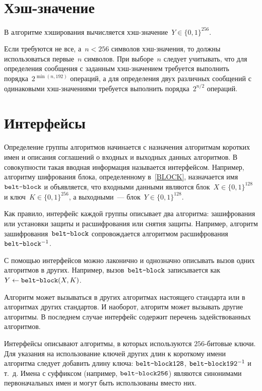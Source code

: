\section{Хэш-значение}\label{COMMON.Hash}

В алгоритме хэширования вычисляется хэш-значение~$Y\in\{0,1\}^{256}$.

Если требуются не все, а~$n<256$ символов хэш-значения, 
то должны использоваться первые~$n$ символов.
%
При выборе~$n$ следует учитывать, что для определения сообщения с заданным
хэш-значением требуется выполнить порядка~$2^{\min(n,192)}$ операций, а для
определения двух различных сообщений с одинаковыми хэш-значениями требуется
выполнить порядка~$2^{n/2}$ операций.

\section{Интерфейсы}\label{COMMON.IFace}

Определение группы алгоритмов начинается с назначения алгоритмам коротких 
имен и описания соглашений о входных и выходных данных алгоритмов.
В совокупности такая вводная информация называется интерфейсом.
%
Например, алгоритму шифрования блока, определенному в~\ref{BLOCK},
назначается имя~$\texttt{belt-block}$ и объявляется, что входными 
данными являются блок~$X\in\{0,1\}^{128}$ и ключ~$K\in\{0,1\}^{256}$,
а выходными~--- блок~$Y\in\{0,1\}^{128}$.

Как правило, интерфейс каждой группы описывает два алгоритма: зашифрования 
или установки защиты и расшифрования или снятия защиты. Например, 
алгоритм зашифрования~$\texttt{belt-block}$ сопровождается 
алгоритмом расшифрования~$\texttt{belt-block}^{-1}$.

С помощью интерфейсов можно лаконично и однозначно 
описывать вызов одних алгоритмов в других.
%        	
Например, вызов~$\texttt{belt-block}$ 
записывается как~$Y\leftarrow\texttt{belt-block}(X,K)$.

Алгоритм может вызываться в других алгоритмах настоящего стандарта или 
в алгоритмах других стандартов. И наоборот, алгоритм может 
вызывать другие алгоритмы. В последнем случае интерфейс содержит перечень 
задействованных алгоритмов.

Интерфейсы описывают алгоритмы, в которых используются $256$-битовые 
ключи. Для указания на использование ключей других длин к короткому 
имени алгоритма следует добавить длину ключа:
$\texttt{belt-block128}$, $\texttt{belt-block192}^{-1}$ и т.~д.
%
Имена с суффиксом  (например, $\texttt{belt-block256}$) 
являются синонимами первоначальных имен и могут быть использованы вместо них.


